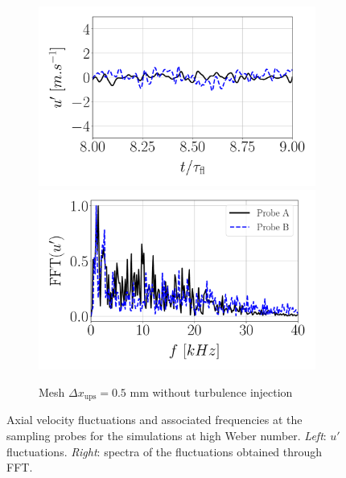 \begin{figure}[ht]
\begin{subfigure}[b]{1.0\textwidth}
	\centering
   \includegraphics[scale=0.28]{./part2_developments/figures_ch5_resolved_JICF/results_ics_mesh_convergence_probes/up_dx0p5_no_turb.pdf}
   \includegraphics[scale=0.28]{./part2_developments/figures_ch5_resolved_JICF/results_ics_mesh_convergence_probes/spectra_linear_scale_dx0p5_no_turb.pdf}
   \caption{Mesh $\Delta x_\mathrm{ups} = 0.5$ mm without turbulence injection}
   \label{fig:ics_mesh_independency_study_probes_dx0p5_no_turb}
\end{subfigure}

\caption[Axial velocity fluctuations and associated frequencies at the sampling probes for the simulations at high Weber number.]{
Axial velocity fluctuations and associated frequencies at the sampling probes for the simulations at high Weber number. \textsl{Left}: $u'$ fluctuations. \textsl{Right}: spectra of the fluctuations obtained through FFT.}
\label{fig:ics_mesh_independency_study_probes}
\end{figure}




